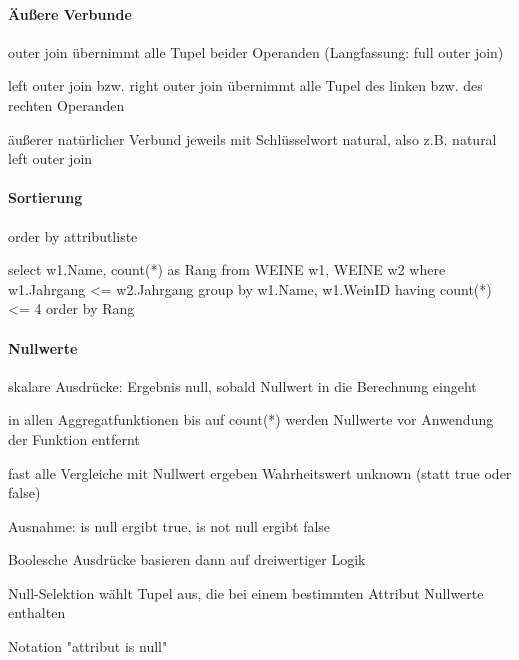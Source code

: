 \documentclass[a4paper]{article}
\begin{document}
\begin{multicols}{3}
\paragraph{Äußere Verbunde}
\begin{itemize*}
    \item outer join übernimmt alle Tupel beider Operanden (Langfassung: full outer join)
    \item left outer join bzw. right outer join übernimmt alle Tupel des linken bzw. des rechten Operanden
    \item äußerer natürlicher Verbund jeweils mit Schlüsselwort natural, also z.B. natural left outer join
\end{itemize*}

\paragraph{Sortierung}
order by attributliste

select w1.Name, count(*) as Rang
from WEINE w1, WEINE w2
where w1.Jahrgang <= w2.Jahrgang
group by w1.Name, w1.WeinID
having count(*) <= 4
order by Rang

\paragraph{Nullwerte}
\begin{itemize*}
    \item skalare Ausdrücke: Ergebnis null, sobald Nullwert in die Berechnung eingeht
    \item in allen Aggregatfunktionen bis auf count(*) werden Nullwerte vor Anwendung der Funktion entfernt
    \item fast alle Vergleiche mit Nullwert ergeben Wahrheitswert unknown (statt true oder false)
    \item Ausnahme: is null ergibt true, is not null ergibt false
    \item Boolesche Ausdrücke basieren dann auf dreiwertiger Logik
    \item Null-Selektion wählt Tupel aus, die bei einem bestimmten Attribut Nullwerte enthalten
    \item Notation "attribut is null"
\end{itemize*}



\end{multicols}
\end{document}
